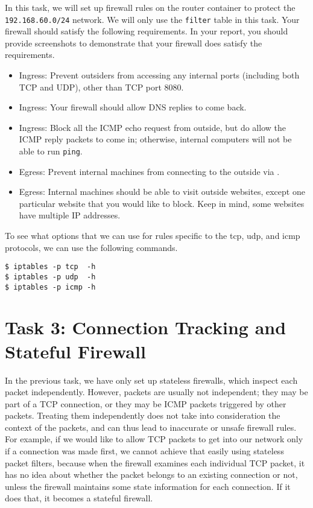 In this task, we will set up firewall rules on the router container
to protect the \texttt{192.168.60.0/24} network. We will only use 
the \texttt{filter} table in this task.  
Your firewall should satisfy the following requirements. 
In your report, you should provide screenshots to demonstrate 
that your firewall does satisfy the requirements.


\begin{itemize}
\item Ingress: Prevent outsiders from accessing any internal ports (including
both TCP and UDP), other than TCP port 8080. 
 
\item Ingress: Your firewall should allow DNS replies to come back. 

\item Ingress: Block all the ICMP echo request from outside, but 
do allow the ICMP reply packets to come in; otherwise, internal 
computers will not be able to run \texttt{ping}.  

\item Egress: Prevent internal machines from connecting to the outside 
      via \telnet.

\item Egress: Internal machines should be able to visit outside websites, 
except one particular website that you would like to block. Keep in mind, 
some websites have multiple IP addresses. 

\end{itemize}


To see what options that we can use for rules specific to the tcp, udp, and 
icmp protocols, we can use the following commands. 

\begin{lstlisting}
$ iptables -p tcp  -h
$ iptables -p udp  -h
$ iptables -p icmp -h
\end{lstlisting}
 




\section{Task 3: Connection Tracking and Stateful Firewall}


In the previous task, we have only set up stateless firewalls, which inspect each
packet independently. However, packets
are usually not independent; they may be part of a TCP connection,
or they may be ICMP packets triggered by other packets. Treating them
independently does not take into consideration the context of the
packets, and can thus lead to inaccurate or unsafe firewall rules.
For example, if we would like to allow TCP packets to get into our network
only if a connection was made first, we cannot achieve that easily 
using stateless packet filters, because when the firewall examines each individual TCP packet,
it has no idea about whether the packet belongs to an existing connection
or not, unless the firewall maintains some state information for each connection.
If it does that, it becomes a stateful firewall.


